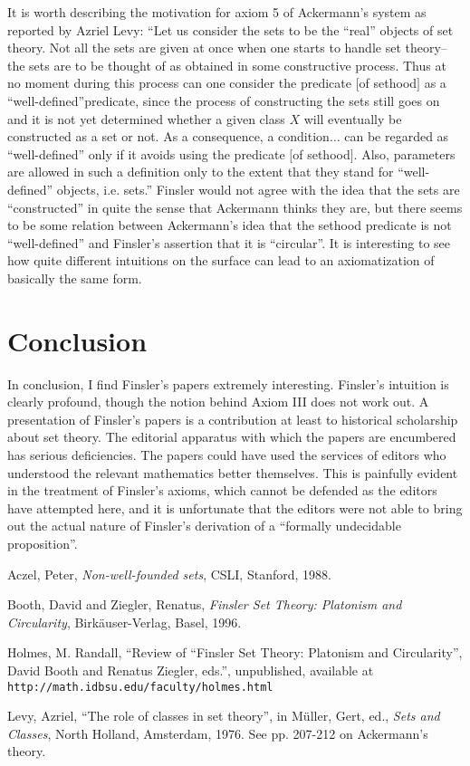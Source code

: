 It is worth describing the motivation for axiom 5 of Ackermann's
system as reported by Azriel Levy: ``Let us consider the sets to be
the ``real'' objects of set theory.  Not all the sets are given at
once when one starts to handle set theory--the sets are to be thought
of as obtained in some constructive process.  Thus at no moment during
this process can one consider the predicate $[$of sethood$]$ as a
``well-defined''predicate, since the process of constructing the sets
still goes on and it is not yet determined whether a given class $X$
will eventually be constructed as a set or not.  As a consequence, a
condition$\ldots$ can be regarded as ``well-defined'' only if it
avoids using the predicate $[$of sethood$]$.  Also, parameters are
allowed in such a definition only to the extent that they stand for
``well-defined'' objects, i.e. sets.''  Finsler would not agree with
the idea that the sets are ``constructed'' in quite the sense that
Ackermann thinks they are, but there seems to be some relation between
Ackermann's idea that the sethood predicate is not ``well-defined''
and Finsler's assertion that it is ``circular''.  It is interesting to
see how quite different intuitions on the surface can lead to an
axiomatization of basically the same form.

\section{Conclusion}

In conclusion, I find Finsler's papers extremely interesting.
Finsler's intuition is clearly profound, though the notion behind
Axiom III does not work out.  A presentation of Finsler's papers is a
contribution at least to historical scholarship about set theory.  The
editorial apparatus with which the papers are encumbered has serious
deficiencies.  The papers could have used the services of editors who
understood the relevant mathematics better themselves.  This is
painfully evident in the treatment of Finsler's axioms, which cannot
be defended as the editors have attempted here, and it is unfortunate
that the editors were not able to bring out the actual nature of
Finsler's derivation of a ``formally undecidable proposition''.

Aczel, Peter, {\em Non-well-founded sets\/}, CSLI, Stanford, 1988.

Booth, David and Ziegler, Renatus, {\em Finsler Set Theory:  Platonism and Circularity\/}, Birk\"auser-Verlag, Basel, 1996.

Holmes, M. Randall, ``Review of ``Finsler Set Theory:
Platonism and Circularity'', David Booth and Renatus Ziegler, eds.'', unpublished, available at {\tt
http://math.idbsu.edu/faculty/holmes.html}

Levy, Azriel, ``The role of classes in set theory'', in M\"uller,
Gert, ed., {\em Sets and Classes\/}, North Holland, Amsterdam, 1976.
See pp. 207-212 on Ackermann's theory.












